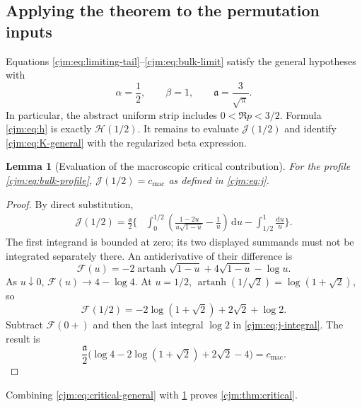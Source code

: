 \documentclass[11pt,a4paper]{article}
\newtheorem{lemma}[lemma]{Lemma}
\theoremstyle{definition}\newaliascnt{definition}{theorem}
\theoremstyle{remark}\newaliascnt{remark}{theorem}
\newcommand{\dd}{\mathrm d}
\newcommand{\cjmac}{c_{\mathrm{mac}}}
\begin{document}
\subsection{Applying the theorem to the permutation inputs}
Equations \eqref{cjm:eq:limiting-tail}--\eqref{cjm:eq:bulk-limit} satisfy
the general hypotheses with
\[
 \alpha=\frac12,\qquad\beta=1,\qquad \mathfrak a=\frac3{\sqrt\pi}.
\]
In particular, the abstract uniform strip includes $0<\Re p<3/2$. Formula
\eqref{cjm:eq:h} is exactly $\mathcal H(1/2)$. It remains to evaluate
$\mathcal J(1/2)$ and identify \eqref{cjm:eq:K-general} with the
regularized beta expression.

\begin{lemma}[Evaluation of the macroscopic critical contribution]
\label{cjm:lem:j}
For the profile \eqref{cjm:eq:bulk-profile}, $\mathcal J(1/2)=\cjmac$ as
defined in \eqref{cjm:eq:j}.
\end{lemma}
\begin{proof}
By direct substitution,
\begin{align}
 \mathcal J(1/2)=\frac{\mathfrak a}2\bigg\{
 &\int_0^{1/2}\left(\frac{1-2u}{u\sqrt{1-u}}-\frac1u\right)\,\dd u
   -\int_{1/2}^1\frac{\dd u}{u}\bigg\}.
 \label{cjm:eq:j-integral}
\end{align}
The first integrand is bounded at zero; its two displayed summands must
not be integrated separately there. An antiderivative of their difference
is
\[
 \mathcal F(u)=-2\operatorname{artanh}\sqrt{1-u}
                 +4\sqrt{1-u}-\log u.
\]
As $u\downarrow0$, $\mathcal F(u)\to4-\log4$. At $u=1/2$,
$\operatorname{artanh}(1/\sqrt2)=\log(1+\sqrt2)$, so
\[
 \mathcal F(1/2)=-2\log(1+\sqrt2)+2\sqrt2+\log2.
\]
Subtract $\mathcal F(0+)$ and then the last integral $\log2$ in
\eqref{cjm:eq:j-integral}. The result is
\[
 \frac{\mathfrak a}2\bigl(\log4-2\log(1+\sqrt2)+2\sqrt2-4\bigr)=\cjmac.
\]
\end{proof}
Combining \eqref{cjm:eq:critical-general} with \cref{cjm:lem:j} proves
\cref{cjm:thm:critical}.
\end{document}
